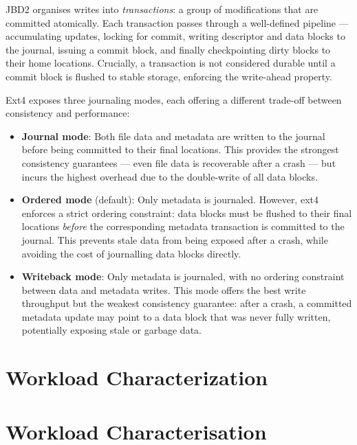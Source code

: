 \documentclass[12pt,a4paper]{article}
\begin{document}
JBD2 organises writes into \textit{transactions}: a group of modifications that are
committed atomically. Each transaction passes through a well-defined pipeline ---
accumulating updates, locking for commit, writing descriptor and data blocks to the
journal, issuing a commit block, and finally checkpointing dirty blocks to their home
locations. Crucially, a transaction is not considered durable until a commit block is
flushed to stable storage, enforcing the write-ahead property.

Ext4 exposes three journaling modes, each offering a different trade-off between
consistency and performance:

\begin{itemize}
    \item \textbf{Journal mode}: Both file data and metadata are written to the journal
    before being committed to their final locations. This provides the strongest
    consistency guarantees --- even file data is recoverable after a crash --- but incurs
    the highest overhead due to the double-write of all data blocks.

    \item \textbf{Ordered mode} (default): Only metadata is journaled. However, ext4
    enforces a strict ordering constraint: data blocks must be flushed to their final
    locations \emph{before} the corresponding metadata transaction is committed to the
    journal. This prevents stale data from being exposed after a crash, while avoiding
    the cost of journalling data blocks directly.

    \item \textbf{Writeback mode}: Only metadata is journaled, with no ordering
    constraint between data and metadata writes. This mode offers the best write
    throughput but the weakest consistency guarantee: after a crash, a committed metadata
    update may point to a data block that was never fully written, potentially exposing
    stale or garbage data.
\end{itemize}

\section{Workload Characterization}
\section{Workload Characterisation}
\end{document}
